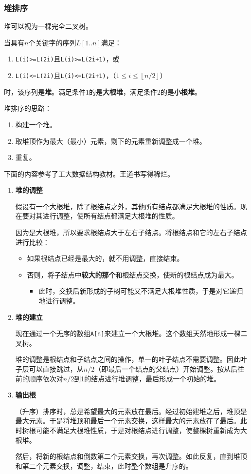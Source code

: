 \documentclass[12pt, a4paper, oneside]{ctexart}
\begin{document}
\subsubsection{堆排序}

堆可以视为一棵完全二叉树。

当具有$n$个关键字的序列$L[1..n]$满足：
\begin{enumerate}
  \item \verb|L(i)>=L(2i)|且\verb|L(i)>=L(2i+1)|，或
  \item \verb|L(i)<=L(2i)|且\verb|L(i)<=L(2i+1)|，（$1\leq i\leq \left\lfloor n/2\right\rfloor$）
\end{enumerate}

时，该序列是\textbf{堆}。满足条件1的是\textbf{大根堆}，满足条件2的是\textbf{小根堆}。

堆排序的思路：
\begin{enumerate}
  \item 构建一个堆。
  \item 取堆顶作为最大（最小）元素，剩下的元素重新调整成一个堆。
  \item 重复。
\end{enumerate}

下面的内容参考了工大数据结构教材。王道书写得稀烂。
\begin{enumerate}
  \item {\bf 堆的调整}
  
  假设有一个大根堆，除了根结点之外，其他所有结点都满足大根堆的性质。现在要对其进行调整，使所有结点都满足大根堆的性质。

  因为是大根堆，所以要求根结点大于左右子结点。将根结点和它的左右子结点进行比较：
  \begin{itemize}
    \item 如果根结点已经是最大的，就不用调整，直接结束。
    \item 否则，将子结点中\textbf{较大的那个}和根结点交换，使新的根结点成为最大。
    \begin{itemize}
      \item 此时，交换后新形成的子树可能又不满足大根堆性质，于是对它递归地进行调整。
    \end{itemize}
  \end{itemize}

  \item {\bf 堆的建立}
  
  现在通过一个无序的数组\verb|A[n]|来建立一个大根堆。这个数组天然地形成一棵二叉树。

  堆的调整是根结点和子结点之间的操作，单一的叶子结点不需要调整。因此叶子层可以直接跳过，从$n/2$（即最后一个结点的父结点）开始调整。按从后往前的顺序依次对$n/2$到1的结点进行堆调整，最后形成一个初始的堆。

  \item {\bf 输出根}
  
  （升序）排序时，总是希望最大的元素放在最后。经过初始建堆之后，堆顶是最大元素。于是将堆顶和最后一个元素交换，这样最大的元素放在了最后。此时树根可能不满足大根堆性质，于是对根结点进行调整，使整棵树重新成为大根堆。

  然后，将新的根结点和倒数第二个元素交换，再次调整。如此反复，直到堆顶和第二个元素交换，调整，结束，此时整个数组是升序的。
\end{enumerate}
\end{document}
